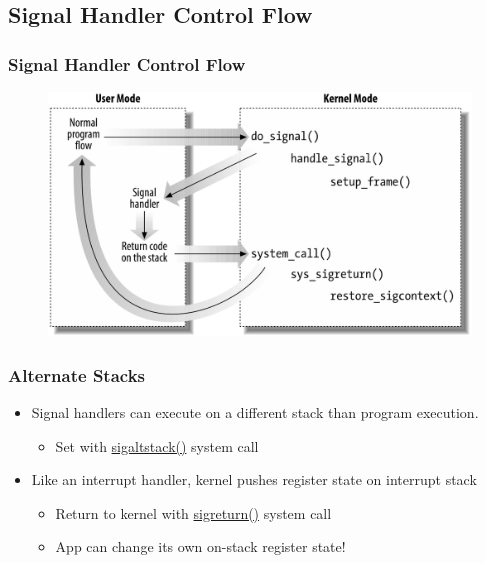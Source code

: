 \subsection{Signal Handler Control Flow} %
\begin{frame}[fragile]
    \frametitle{Signal Handler Control Flow}
    \begin{figure}
	\includegraphics[width=0.8\linewidth]{figs/signal-control-flow.png}
	\end{figure}
\end{frame}
% 
% 
\begin{frame}[fragile]
    \frametitle{Alternate Stacks}
    \begin{itemize}
        \item Signal handlers can execute on a different stack than program execution.
        \begin{itemize}
            \item Set with \href{https://linux.die.net/man/3/sigaltstack}{sigaltstack()} system call
        \end{itemize} \pause
        \item Like an interrupt handler, kernel pushes register state on interrupt stack
        \begin{itemize}
            \item Return to kernel with \href{https://man7.org/linux/man-pages/man2/sigreturn.2.html}{sigreturn()} system call
            \item App can change its own on-stack register state!
        \end{itemize}
    \end{itemize}
\end{frame}
